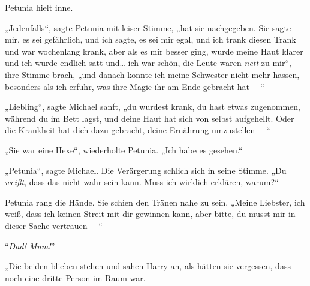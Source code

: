 Petunia hielt inne.

„Jedenfalls“, sagte Petunia mit leiser Stimme, „hat sie nachgegeben. Sie sagte mir, es sei gefährlich, und ich sagte, es sei mir egal, und ich trank diesen Trank und war wochenlang krank, aber als es mir besser ging, wurde meine Haut klarer und ich wurde endlich satt und… ich war schön, die Leute waren \emph{nett} zu mir“, ihre Stimme brach, „und danach konnte ich meine Schwester nicht mehr hassen, besonders als ich erfuhr, was ihre Magie ihr am Ende gebracht hat —“

„Liebling“, sagte Michael sanft, „du wurdest krank, du hast etwas zugenommen, während du im Bett lagst, und deine Haut hat sich von selbst aufgehellt. Oder die Krankheit hat dich dazu gebracht, deine Ernährung umzustellen —“

„Sie war eine Hexe“, wiederholte Petunia. „Ich habe es gesehen.“

„Petunia“, sagte Michael. Die Verärgerung schlich sich in seine Stimme. „Du \emph{weißt}, dass das nicht wahr sein kann. Muss ich wirklich erklären, warum?“

Petunia rang die Hände. Sie schien den Tränen nahe zu sein. „Meine Liebster, ich weiß, dass ich keinen Streit mit dir gewinnen kann, aber bitte, du musst mir in dieser Sache vertrauen —“

“\emph{Dad! Mum!}”

„Die beiden blieben stehen und sahen Harry an, als hätten sie vergessen, dass noch eine dritte Person im Raum war.

